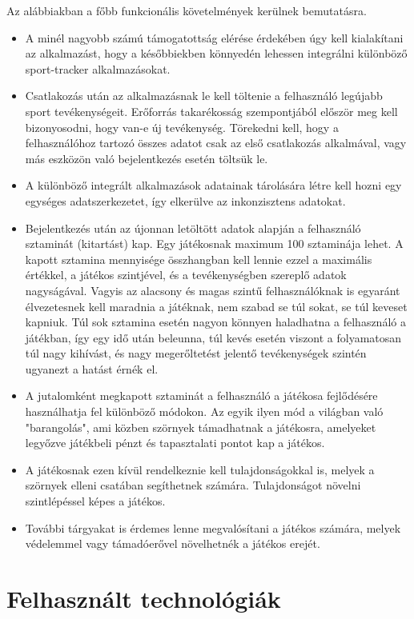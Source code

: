 Az alábbiakban a főbb funkcionális követelmények kerülnek bemutatásra. 

\begin{itemize}
	\item 
	A minél nagyobb számú támogatottság elérése érdekében úgy kell kialakítani az alkalmazást, hogy a későbbiekben könnyedén lehessen integrálni különböző sport-tracker alkalmazásokat. 
	\item 
	Csatlakozás után az alkalmazásnak le kell töltenie a felhasználó legújabb sport tevékenységeit. 
	Erőforrás takarékosság szempontjából először meg kell bizonyosodni, hogy van-e új tevékenység. 
	Törekedni kell, hogy a felhasználóhoz tartozó összes adatot csak az első csatlakozás alkalmával, vagy más eszközön való bejelentkezés esetén töltsük le. 
	\item
	A különböző integrált alkalmazások adatainak tárolására létre kell hozni egy egységes adatszerkezetet, így elkerülve az inkonzisztens adatokat. 
	\item 
	Bejelentkezés után az újonnan letöltött adatok alapján a felhasználó sztaminát (kitartást) kap. 
	Egy játékosnak maximum 100 sztaminája lehet. 
	A kapott sztamina mennyisége összhangban kell lennie ezzel a maximális értékkel, a játékos szintjével, és a tevékenységben szereplő adatok nagyságával. 
	Vagyis az alacsony és magas szintű felhasználóknak is egyaránt élvezetesnek kell maradnia a játéknak, nem szabad se túl sokat, se túl keveset kapniuk. 
	Túl sok sztamina esetén nagyon könnyen haladhatna a felhasználó a játékban, így egy idő után beleunna, túl kevés esetén viszont a folyamatosan túl nagy kihívást, és nagy megerőltetést jelentő tevékenységek szintén ugyanezt a hatást érnék el.
	\item 
	A jutalomként megkapott sztaminát a felhasználó a játékosa fejlődésére használhatja fel különböző módokon. 
	Az egyik ilyen mód a világban való "barangolás", ami közben szörnyek támadhatnak a játékosra, amelyeket legyőzve játékbeli pénzt és tapasztalati pontot kap a játékos. 
	\item 
	A játékosnak ezen kívül rendelkeznie kell tulajdonságokkal is, melyek a szörnyek elleni csatában segíthetnek számára. 
	Tulajdonságot növelni szintlépéssel képes a játékos. 
	\item 
	További tárgyakat is érdemes lenne megvalósítani a játékos számára, melyek védelemmel vagy támadóerővel növelhetnék a játékos erejét.
\end{itemize}


\section{Felhasznált technológiák}
\label{felhtechnologia}

